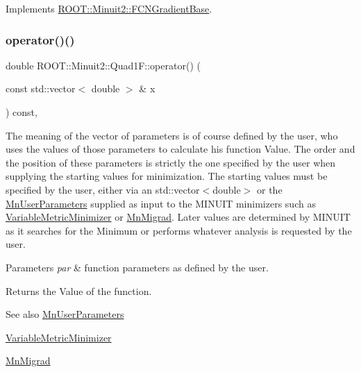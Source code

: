 Implements \mbox{\hyperlink{classROOT_1_1Minuit2_1_1FCNGradientBase_a004740e7e25a1358aafde6694196ef88}{R\+O\+O\+T\+::\+Minuit2\+::\+F\+C\+N\+Gradient\+Base}}.

\mbox{\label{classROOT_1_1Minuit2_1_1Quad1F_a879588547439114ea9ad1e749f1300c5}} 
\subsubsection{\texorpdfstring{operator()()}{operator()()}}
{\footnotesize\ttfamily double R\+O\+O\+T\+::\+Minuit2\+::\+Quad1\+F\+::operator() (\begin{DoxyParamCaption}\item[{const std\+::vector$<$ double $>$ \&}]{x }\end{DoxyParamCaption}) const\hspace{0.3cm}{\ttfamily [inline]}, {\ttfamily [virtual]}}

The meaning of the vector of parameters is of course defined by the user, who uses the values of those parameters to calculate his function Value. The order and the position of these parameters is strictly the one specified by the user when supplying the starting values for minimization. The starting values must be specified by the user, either via an std\+::vector$<$double$>$ or the \mbox{\hyperlink{classROOT_1_1Minuit2_1_1MnUserParameters}{Mn\+User\+Parameters}} supplied as input to the M\+I\+N\+U\+IT minimizers such as \mbox{\hyperlink{classROOT_1_1Minuit2_1_1VariableMetricMinimizer}{Variable\+Metric\+Minimizer}} or \mbox{\hyperlink{classROOT_1_1Minuit2_1_1MnMigrad}{Mn\+Migrad}}. Later values are determined by M\+I\+N\+U\+IT as it searches for the Minimum or performs whatever analysis is requested by the user.


\begin{DoxyParams}{Parameters}
{\em par} & function parameters as defined by the user.\\
\hline
\end{DoxyParams}
\begin{DoxyReturn}{Returns}
the Value of the function.
\end{DoxyReturn}
\begin{DoxySeeAlso}{See also}
\mbox{\hyperlink{classROOT_1_1Minuit2_1_1MnUserParameters}{Mn\+User\+Parameters}} 

\mbox{\hyperlink{classROOT_1_1Minuit2_1_1VariableMetricMinimizer}{Variable\+Metric\+Minimizer}} 

\mbox{\hyperlink{classROOT_1_1Minuit2_1_1MnMigrad}{Mn\+Migrad}} 
\end{DoxySeeAlso}


